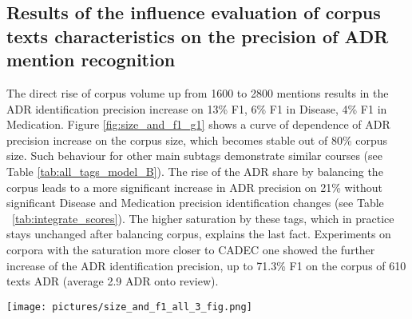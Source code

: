 \documentclass[a4paper,fleqn,longmktitle]{cas-dc}
\begin{document}
\subsection{Results  of the influence evaluation of corpus texts characteristics on the precision of ADR mention recognition }


The direct rise of corpus volume up from 1600 to 2800 mentions results in the ADR identification precision increase on 13\% F1, 6\% F1 in Disease, 4\% F1 in Medication. Figure \ref{fig:size_and_f1_g1} shows a curve of dependence of ADR precision increase on the corpus size, which becomes stable out of 80\% corpus size. Such behaviour for other main subtags demonstrate similar courses (see Table \ref{tab:all_tags_model_B}). The rise of the  ADR share by balancing the corpus leads to a more significant increase in ADR precision on 21\% without significant Disease and Medication precision identification changes (see Table ~\ref{tab:integrate_scores}). The higher saturation by these tags, which in practice stays unchanged after balancing corpus, explains the last fact. Experiments on corpora with the saturation more closer to CADEC one showed the further increase of  the ADR identification precision, up to 71.3\% F1 on the corpus of 610 texts ADR (average 2.9 ADR onto review).



\begin{figure*}
    \centering
    
    \texttt{[image: pictures/size\_and\_f1\_all\_3\_fig.png]}
    
    \caption{Dependency of the accuracy on the size of training set for different tags in RDRS 2800}
    \label{fig:size_and_f1_g1}
\end{figure*}


\begin{table}
\centering
\caption{F1-scores of the model B for RDRS 1250 and RDRS 2800. *Negative -- union of tags: Worse, NegatedADE, ADE-Neg.}

\label{tab:all_tags_model_B}
\end{table}



\begin{table}
\centering
\caption{The difference in accuracy for the 3 main tags depending on the size and balance of the corpus} \label{tab:integrate_scores}

\end{table}
\end{document}
